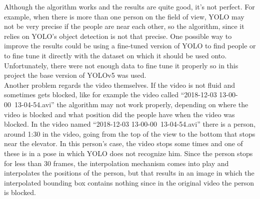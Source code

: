 \documentclass[conference]{IEEEtran}
\begin{document}
		Although the algorithm works and the results are quite good, it's not perfect. For example, when there is more than one person on the field of view,
		YOLO may not be very precise if the people are near each other, so the algorithm, since it relies on YOLO's object detection is not that precise. 
		One possible way to improve the results could be using a fine-tuned version of YOLO to find people or to fine tune it directly with the dataset on which 
		it should be used onto. Unfortunately, there were not enough data to fine tune it properly so in this project the base version of YOLOv5 was used.\\
		Another problem regards the video themselves. If the video is not fluid and sometimes gets blocked, like for example the video called ``2018-12-03 13-00-00~13-04-54.avi''
		the algorithm may not work properly, depending on where the video is blocked and what position did the people have when the video was blocked. In the 
		video named ``2018-12-03 13-00-00~13-04-54.avi'' there is a person, around 1:30 in the video, going from the top of the view to the bottom that stops 
		near the elevator. In this person's case, the video stops some times and one of these is in a pose in which YOLO does not recognize him. Since the person 
		stops for less than 30 frames, the interpolation mechanism comes into play and interpolates the positions of the person, but that results in an image 
		in which the interpolated bounding box contains nothing since in the original video the person is blocked.

		
	\nocite{*}
	\printbibliography
\end{document}
